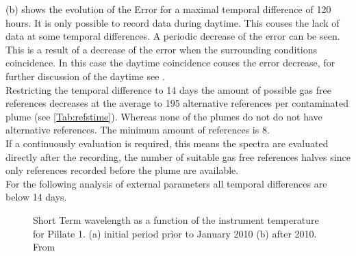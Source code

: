 \documentclass  [
  paper    = a4,
  BCOR     = 10mm,
  twoside,
  fontsize = 12pt,
  fleqn,
  toc      = bibnumbered,
  toc      = listofnumbered,
  numbers  = noendperiod,
  headings = normal,
  listof   = leveldown,
  version  = 3.03
]                                       {scrreprt}
\begin{document}
	  (b) shows the evolution of the   Error for a maximal temporal difference of 120 hours. It is only possible to record data during daytime. This couses the lack of data at some temporal differences. A periodic decrease of the   error can be seen. This is a result of a decrease of the   error when the surrounding conditions coincidence. In this case the daytime coincidence couses the   error decrease, for further discussion of the daytime see .\\
	Restricting the temporal difference to 14 days the amount of possible gas free references decreases at the average to 195 alternative references per contaminated plume (see \cref{Tab:refstime}). Whereas none of the plumes do not do not have alternative references. The minimum amount of references is 8.\\
	If a continuously evaluation is required, this means the spectra are evaluated directly after the recording, the number of suitable gas free references halves since only references recorded before the plume are available.\\
	For the following analysis of external parameters all temporal differences are below 14 days.
	\begin{figure}		
		\caption{Short Term wavelength as a function of the instrument temperature for Pillate 1. (a) initial period  prior to January 2010 (b) after 2010. From \cite{WarnachSimon}}
		\label{fig:shorttermshift}
	\end{figure}
\end{document}
